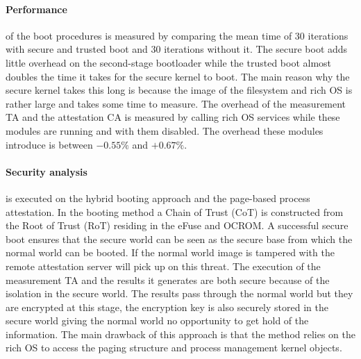 \paragraph*{Performance}
of the boot procedures is measured by comparing the mean time of 30 iterations with secure and trusted boot and 30 iterations without it. The secure boot adds little overhead on the second-stage bootloader while the trusted boot almost doubles the time it takes for the secure kernel to boot. The main reason why the secure kernel takes this long is because the image of the filesystem and rich OS is rather large and takes some time to measure. The overhead of the measurement TA and the attestation CA is measured by calling rich OS services while these modules are running and with them disabled. The overhead these modules introduce is between $-0.55\%$ and $+0.67\%$.

\paragraph*{Security analysis}
is executed on the hybrid booting approach and the page-based process attestation. In the booting method a Chain of Trust (CoT) is constructed from the Root of Trust (RoT) residing in the eFuse and OCROM. A successful secure boot ensures that the secure world can be seen as the secure base from which the normal world can be booted. If the normal world image is tampered with the remote attestation server will pick up on this threat. The execution of the measurement TA and the results it generates are both secure because of the isolation in the secure world. The results pass through the normal world but they are encrypted at this stage, the encryption key is also securely stored in the secure world giving the normal world no opportunity to get hold of the information. The main drawback of this approach is that the method relies on the rich OS to access the paging structure and process management kernel objects.